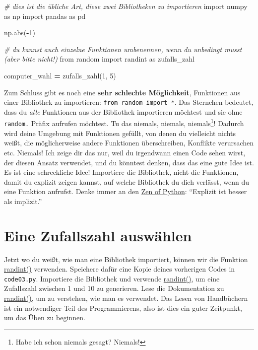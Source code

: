 \documentclass[
]{book}
\newenvironment{Shaded}{\begin{snugshade}}{\end{snugshade}}
\newcommand{\BuiltInTok}[1]{#1}
\newcommand{\CommentTok}[1]{\textcolor[rgb]{0.56,0.35,0.01}{\textit{#1}}}
\newcommand{\DecValTok}[1]{\textcolor[rgb]{0.00,0.00,0.81}{#1}}
\newcommand{\ImportTok}[1]{#1}
\newcommand{\NormalTok}[1]{#1}
\newcommand{\OperatorTok}[1]{\textcolor[rgb]{0.81,0.36,0.00}{\textbf{#1}}}
\begin{document}
\begin{Shaded}
\begin{Highlighting}[]
\CommentTok{\# dies ist die übliche Art, diese zwei Bibliotheken zu importieren}
\ImportTok{import}\NormalTok{ numpy }\ImportTok{as}\NormalTok{ np}
\ImportTok{import}\NormalTok{ pandas }\ImportTok{as}\NormalTok{ pd}

\NormalTok{np.}\BuiltInTok{abs}\NormalTok{(}\OperatorTok{{-}}\DecValTok{1}\NormalTok{)}

\CommentTok{\# du kannst auch einzelne Funktionen umbenennen, wenn du unbedingt musst (aber bitte nicht!)}
\ImportTok{from}\NormalTok{ random }\ImportTok{import}\NormalTok{ randint }\ImportTok{as}\NormalTok{ zufalls\_zahl}

\NormalTok{computer\_wahl }\OperatorTok{=}\NormalTok{ zufalls\_zahl(}\DecValTok{1}\NormalTok{, }\DecValTok{5}\NormalTok{)}
\end{Highlighting}
\end{Shaded}

Zum Schluss gibt es noch eine \textbf{sehr schlechte Möglichkeit}, Funktionen aus einer Bibliothek zu importieren: \texttt{from\ random\ import\ *}. Das Sternchen bedeutet, dass du \emph{alle} Funktionen aus der Bibliothek importieren möchtest und sie ohne \texttt{random.} Präfix aufrufen möchtest. Tu das niemals, niemals, niemals\footnote{Habe ich schon niemals gesagt? Niemals!}! Dadurch wird deine Umgebung mit Funktionen gefüllt, von denen du vielleicht nichts weißt, die möglicherweise andere Funktionen überschreiben, Konflikte verursachen etc. Niemals! Ich zeige dir das nur, weil du irgendwann einen Code sehen wirst, der diesen Ansatz verwendet, und du könntest denken, dass das eine gute Idee ist. Es ist eine schreckliche Idee! Importiere die Bibliothek, nicht die Funktionen, damit du explizit zeigen kannst, auf welche Bibliothek du dich verlässt, wenn du eine Funktion aufrufst. Denke immer an den \href{https://www.python.org/dev/peps/pep-0020/}{Zen of Python}: ``Explizit ist besser als implizit.''

\hypertarget{eine-zufallszahl-auswuxe4hlen}{%
\section{Eine Zufallszahl auswählen}\label{eine-zufallszahl-auswuxe4hlen}}

Jetzt wo du weißt, wie man eine Bibliothek importiert, können wir die Funktion \href{https://docs.python.org/3/library/random.html\#random.randint}{randint()} verwenden. Speichere dafür eine Kopie deines vorherigen Codes in \texttt{code03.py}. Importiere die Bibliothek und verwende \href{https://docs.python.org/3/library/random.html\#random.randint}{randint()}, um eine Zufallszahl zwischen 1 und 10 zu generieren. Lese die Dokumentation zu \href{https://docs.python.org/3/library/random.html\#random.randint}{randint()}, um zu verstehen, wie man es verwendet. Das Lesen von Handbüchern ist ein notwendiger Teil des Programmierens, also ist dies ein guter Zeitpunkt, um das Üben zu beginnen.
\end{document}

